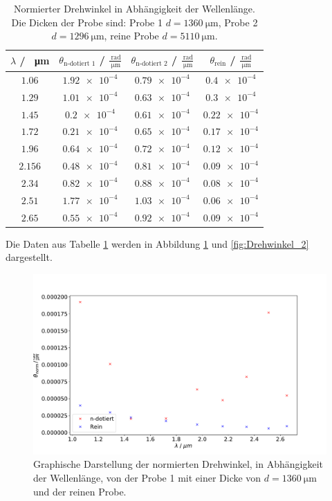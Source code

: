 \begin{table}
  \centering
  \begin{tabular}{c c c c}
    \toprule
    $\lambda$ / \SI{}{\micro\meter}& $\theta_{\text{n-dotiert 1}}$ / $\frac{\SI{}{\radian}}{\SI{}{\micro\meter}}$& 
    $\theta_{\text{n-dotiert 2}}$ / $\frac{\SI{}{\radian}}{\SI{}{\micro\meter}}$&
    $\theta_{\text{rein}}$ / $\frac{\SI{}{\radian}}{\SI{}{\micro\meter}}$\\
    \midrule
    $\num{1.06} $&$\num{1.92e-4}$&$\num{0.79e-4}$&$\num{0.4e-4}$\\
    $\num{1.29} $&$\num{1.01e-4}$&$\num{0.63e-4}$&$\num{0.3e-4}$\\
    $\num{1.45} $&$\num{0.2e-4}$&$\num{0.61e-4}$&$\num{0.22e-4}$\\
    $\num{1.72} $&$\num{0.21e-4}$&$\num{0.65e-4}$&$\num{0.17e-4}$\\
    $\num{1.96} $&$\num{0.64e-4}$&$\num{0.72e-4}$&$\num{0.12e-4}$\\
    $\num{2.156}$&$\num{0.48e-4}$&$\num{0.81e-4}$&$\num{0.09e-4}$\\
    $\num{2.34} $&$\num{0.82e-4}$&$\num{0.88e-4}$&$\num{0.08e-4}$\\
    $\num{2.51} $&$\num{1.77e-4}$&$\num{1.03e-4}$&$\num{0.06e-4}$\\
    $\num{2.65} $&$\num{0.55e-4}$&$\num{0.92e-4}$&$\num{0.09e-4}$\\
    \bottomrule
  \end{tabular}
  \caption{Normierter Drehwinkel in Abhängigkeit der Wellenlänge. Die Dicken der Probe sind: Probe 1 $d=\SI{1360}{\micro\meter}$,
  Probe 2 $d=\SI{1296}{\micro\meter}$, reine Probe $d=\SI{5110}{\micro\meter}$.}
  \label{tab:Drehwinkel_norm}
\end{table}
\FloatBarrier
Die Daten aus Tabelle \ref{tab:Drehwinkel_norm} werden in Abbildung \ref{fig:Drehwinkel_1} und \ref{fig:Drehwinkel_2} 
dargestellt.
\FloatBarrier
\begin{figure}
  \centering
  \includegraphics[width = \textwidth,keepaspectratio]{figure/Theta1_plot.pdf}
  \caption{Graphische Darstellung der normierten Drehwinkel, in Abhängigkeit der Wellenlänge, von der Probe 1 mit einer Dicke von $d=\SI{1360}{\micro\meter}$ und 
  der reinen Probe.}
  \label{fig:Drehwinkel_1}
\end{figure}
